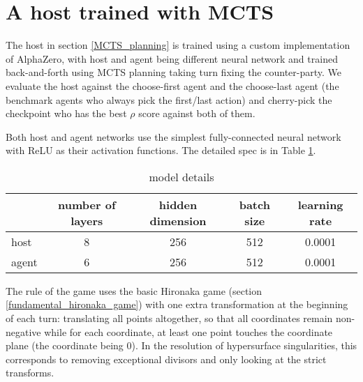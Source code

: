 \documentclass{article}
\theoremstyle{plain}
\theoremstyle{definition}
\theoremstyle{remark}
\begin{document}
\section{A host trained with MCTS}\label{appendix:alphazero}
The host in section \ref{MCTS_planning} is trained using a custom implementation 
of AlphaZero, with host and agent being different neural network and trained back-and-forth using MCTS planning taking turn fixing the counter-party. We evaluate the host against the choose-first agent and the choose-last agent (the benchmark agents who always pick the first/last action) and cherry-pick the checkpoint who has the best $\rho$ score against both of them. 

Both host and agent networks use the simplest fully-connected neural network with ReLU as their activation functions. The detailed spec is in Table \ref{model-spec}.

\begin{table}[t]
\caption{model details}
\label{model-spec}
\vskip 0.1in
\begin{center}
\begin{small}
    \begin{tabular}{l|cccc}
         & number of layers & hidden dimension & batch size & learning rate \\
         \midrule
         host & 8 & 256 & 512 & 0.0001 \\
         agent & 6 & 256 & 512 & 0.0001 \\
         \bottomrule
    \end{tabular}
\end{small}
\end{center}
\vskip -0.1in
\end{table}

The rule of the game uses the basic Hironaka game (section \ref{fundamental_hironaka_game}) with one extra transformation at the beginning of each turn: translating all points altogether, so that all coordinates remain non-negative while for each coordinate, at least one point touches the coordinate plane (the coordinate being $0$). In the resolution of hypersurface singularities, this corresponds to removing exceptional divisors and only looking at the strict transforms.
\end{document}
